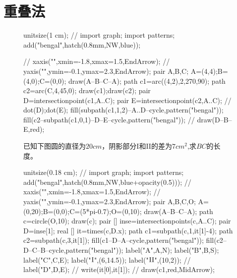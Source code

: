 \documentclass[12pt,space]{ctexart} %
\begin{document}
\section{重叠法}
\begin{figure}[ht]
	\centering
	\begin{minipage}[b]{0.45\textwidth}
		\begin{asy}
			unitsize(1 cm);
			// import graph;
			import patterns;
			add("bengal",hatch(0.8mm,NW,blue));

			// xaxis("",xmin=-1.8,xmax=1.5,EndArrow);
			// yaxis("",ymin=-0.1,ymax=2.3,EndArrow);
			pair A,B,C;
			A=(4,4);B=(4,0);C=(0,0);
			draw(A--B--C--A);
			path c1=arc((4,2),2,270,90);
			path c2=arc(C,4,45,0);
			draw(c1);draw(c2);
			pair D=intersectionpoint(c1,A..C);
			pair E=intersectionpoint(c2,A..C);
			// dot(D);dot(E);
			fill(subpath(c1,1,2)--A..D--cycle,pattern("bengal"));
			fill(c2--subpath(c1,0,1)--D--E--cycle,pattern("bengal"));
			// draw(D--B--E,red);
		\end{asy}
	\end{minipage}
	\qquad
	\begin{minipage}[b]{0.45\textwidth}
		已知下图圆的直径为$20cm$，阴影部分\RN{1}和\RN{2}的差为$7cm^2$,求$BC$的长度。\\
		\begin{asy}
			unitsize(0.18 cm);
			// import graph;
			import patterns;
			add("bengal",hatch(0.8mm,NW,blue+opacity(0.5)));
			// xaxis("",xmin=-1.8,xmax=1.5,EndArrow);
			// yaxis("",ymin=-0.1,ymax=2.3,EndArrow);
			pair A,B,C,O;
			A=(0,20);B=(0,0);C=(5*pi-0.7);O=(0,10);
			draw(A--B--C--A);
			path c=circle(O,10);
			draw(c);
			pair [] inse=intersectionpoints(c,A..C);
			pair D=inse[1];
			real [] it=times(c,D.x);
			path c1=subpath(c,1,it[1]-4);
			path c2=subpath(c,3,it[1]);
			fill(c1--D--A--cycle,pattern("bengal"));
			fill(c2--D--C--B--cycle,pattern("bengal"));
			label("A",A,N);
			label("B",B,S);
			label("C",C,E);
			label("$\rm I$",(6,14.5));
			label("$\rm II$",(10,2));
			// label("D",D,E);
			// write(it[0],it[1]);
			// draw(c1,red,MidArrow);
		\end{asy}
	\end{minipage}
\end{figure}
\vspace{1cm}
\end{document}
